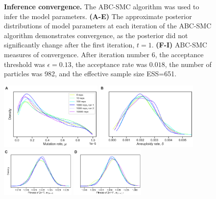 \documentclass[12pt]{extarticle}
\begin{document}
\begin{figure}[h]
\begin{subfigure}{1\textwidth}
     \label{fig:convergence-B}
  \end{subfigure}
    \caption{
    \textbf{Inference convergence.} 
    The ABC-SMC algorithm was used to infer the model parameters. \textbf{(A-E)} The approximate posterior distributions of model parameters at each iteration of the ABC-SMC algorithm demonstrates convergence, as the posterior did not significantly change after the first iteration, $t=1$.
    \textbf{(F-I)} ABC-SMC measures of convergence. After iteration number 6, the acceptance threshold was $\epsilon=0.13$, the acceptance rate was $0.018$, the number of particles was 982, and the effective sample size ESS=651.
}
    \label{fig:convergence}
\end{figure}


\begin{figure}[h]
    \centering
      \includegraphics[width=0.45\textwidth]{../figures/runs-A.pdf}      
      \includegraphics[width=0.45\textwidth]{../figures/runs-B.pdf}    
      \includegraphics[width=0.325\textwidth]{../figures/runs-C.pdf}      
      \includegraphics[width=0.325\textwidth]{../figures/runs-D.pdf}      

\end{figure}
\end{document}
